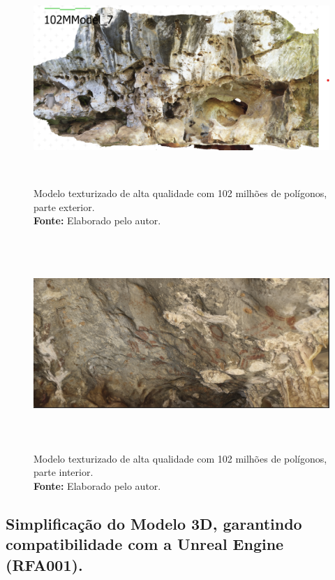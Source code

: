 \begin{enumerate}
\begin{figure}[H]
        \centering
        \includegraphics[height=8cm, keepaspectratio]{img/reality e fotogrametria processo/102M textura.png}
        \caption{Modelo texturizado de alta qualidade com 102 milhões de polígonos, parte exterior. \\
            \textbf{Fonte:} Elaborado pelo autor.}
        \label{fig:texturizado}
\end{figure}
\begin{figure}[H]
        \centering
        \includegraphics[height=8cm, keepaspectratio]{img/reality e fotogrametria processo/interior.png}
        \caption{Modelo texturizado de alta qualidade com 102 milhões de polígonos, parte interior. \\
            \textbf{Fonte:} Elaborado pelo autor.}
        \label{fig:interior}
\end{figure}
\end{enumerate}
    \subsection{Simplificação do Modelo 3D, garantindo compatibilidade com a Unreal Engine (RFA001).}
  
